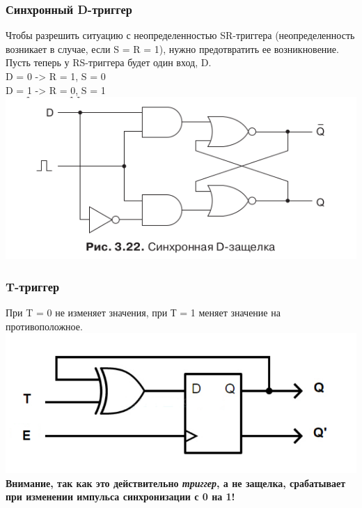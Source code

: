 \documentclass[12pt, a4paper]{article}
\begin{document}
\subsubsection{Синхронный D-триггер}
Чтобы разрешить ситуацию с неопределенностью SR-триггера (неопределенность
возникает в случае, если S = R = 1), нужно предотвратить ее возникновение.\\
Пусть теперь у RS-триггера будет один вход, D.\\
D = 0 -> R = 1, S = 0\\
D = 1 -> R = 0, S = 1\\
\includegraphics[scale=0.6]{./images/3_22.png}
\subsubsection{T-триггер}
При T = 0 не изменяет значения, при Т = 1 меняет значение на противоположное.\\
\includegraphics[scale=0.6]{./images/3_23.png}\\
\textbf{Внимание, так как это действительно \textit{триггер}, а не защелка, срабатывает при изменении импульса синхронизации с 0 на 1!}
\end{document}
